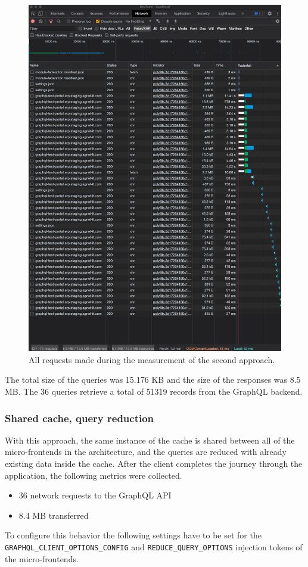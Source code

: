 \ifshowImages
\begin{figure}[H]
\centering
\includegraphics[width=0.6\linewidth]{images/results/1-attempt/shared-not-reduced-cache.png}
\caption{All requests made during the measurement of the second approach.}\label{fig:results:shared-cache-no-reduction}
\end{figure}
\fi

\noindent The total size of the queries was 15.176 KB and the size of the responses was 8.5 MB. The 36 queries retrieve a total of 51319 records from the GraphQL backend.

\subsubsection{Shared cache, query reduction}\label{subsubsection:results:performance-measurement:separate-cache-reduction}

With this approach, the same instance of the cache is shared between all of the micro-frontends in the architecture, and the queries are reduced with already existing data inside the cache. After the client completes the journey through the application, the following metrics were collected.

\begin{itemize}
  \item 36 network requests to the GraphQL \ac{API}
  \item 8.4 MB transferred
\end{itemize}

\noindent To configure this behavior the following settings have to be set for the \texttt{GRAPHQL\_CLIENT\_OPTIONS\_CONFIG} and \texttt{REDUCE\_QUERY\_OPTIONS} injection tokens of the micro-frontends.

